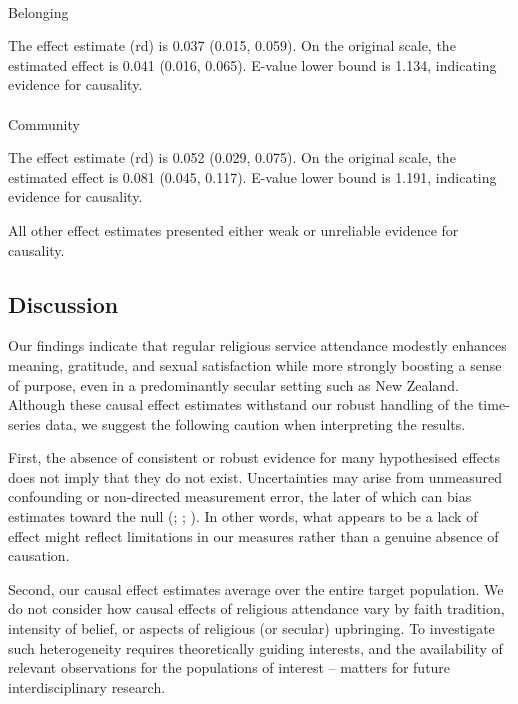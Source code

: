 \documentclass[
  single column]{article}
\makeatletter
\let\oldparagraph\paragraph
\renewcommand{\paragraph}{
    \@ifstar
      \xxxParagraphStar
      \xxxParagraphNoStar
  }
\newcommand{\xxxParagraphStar}[1]{\oldparagraph*{#1}\mbox{}}
\newcommand{\xxxParagraphNoStar}[1]{\oldparagraph{#1}\mbox{}}
\makeatother
\begin{document}
\paragraph{Belonging}\label{belonging}

The effect estimate (rd) is 0.037 (0.015, 0.059). On the original scale,
the estimated effect is 0.041 (0.016, 0.065). E-value lower bound is
1.134, indicating evidence for causality.

\paragraph{Community}\label{community}

The effect estimate (rd) is 0.052 (0.029, 0.075). On the original scale,
the estimated effect is 0.081 (0.045, 0.117). E-value lower bound is
1.191, indicating evidence for causality.

All other effect estimates presented either weak or unreliable evidence
for causality.

\newpage{}

\subsection{Discussion}\label{discussion}

Our findings indicate that regular religious service attendance modestly
enhances meaning, gratitude, and sexual satisfaction while more strongly
boosting a sense of purpose, even in a predominantly secular setting
such as New Zealand. Although these causal effect estimates withstand
our robust handling of the time-series data, we suggest the following
caution when interpreting the results.

First, the absence of consistent or robust evidence for many
hypothesised effects does not imply that they do not exist.
Uncertainties may arise from unmeasured confounding or non-directed
measurement error, the later of which can bias estimates toward the null
(;
;
). In other
words, what appears to be a lack of effect might reflect limitations in
our measures rather than a genuine absence of causation.

Second, our causal effect estimates average over the entire target
population. We do not consider how causal effects of religious
attendance vary by faith tradition, intensity of belief, or aspects of
religious (or secular) upbringing. To investigate such heterogeneity
requires theoretically guiding interests, and the availability of
relevant observations for the populations of interest -- matters for
future interdisciplinary research.
\end{document}
